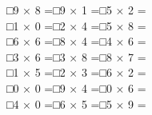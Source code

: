 \documentclass[uplatex,
paper=a4,
fontsize=18pt,
jafontsize=16pt,
number_of_lines=30,
line_length=30zh,
baselineskip=25pt,
]{jlreq}
\begin{document}
□\hspace{1em}9 × 8 =\hspace{3em}□\hspace{1em}9 × 1 =\hspace{3em}□\hspace{1em}5 × 2 =\hspace{3em}
\\

□\hspace{1em}1 × 0 =\hspace{3em}□\hspace{1em}2 × 4 =\hspace{3em}□\hspace{1em}5 × 8 =\hspace{3em}
\\

□\hspace{1em}6 × 6 =\hspace{3em}□\hspace{1em}8 × 4 =\hspace{3em}□\hspace{1em}4 × 6 =\hspace{3em}
\\

□\hspace{1em}3 × 6 =\hspace{3em}□\hspace{1em}3 × 8 =\hspace{3em}□\hspace{1em}8 × 7 =\hspace{3em}
\\

□\hspace{1em}1 × 5 =\hspace{3em}□\hspace{1em}2 × 3 =\hspace{3em}□\hspace{1em}6 × 2 =\hspace{3em}
\\

□\hspace{1em}0 × 0 =\hspace{3em}□\hspace{1em}9 × 4 =\hspace{3em}□\hspace{1em}0 × 6 =\hspace{3em}
\\

□\hspace{1em}4 × 0 =\hspace{3em}□\hspace{1em}6 × 5 =\hspace{3em}□\hspace{1em}5 × 9 =\hspace{3em}
\\
\end{document}
